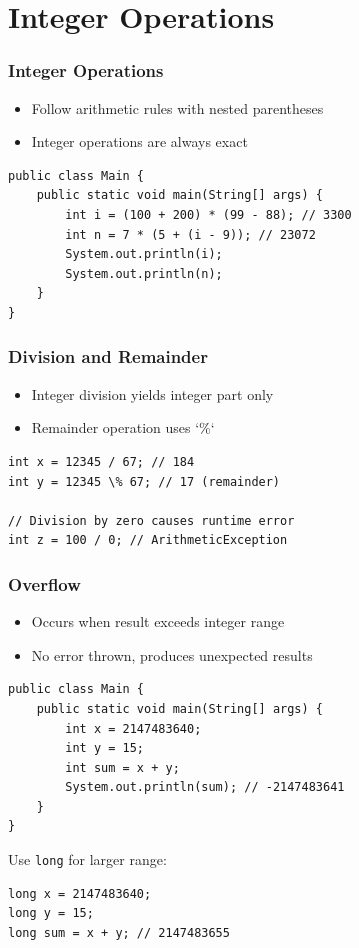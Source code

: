 \documentclass[serif, aspectratio=169]{beamer}
\begin{document}
\section{Integer Operations}
\begin{frame}[fragile]
\frametitle{Integer Operations}
\begin{itemize}
    \item Follow arithmetic rules with nested parentheses
    \item Integer operations are always exact
\end{itemize}
\begin{lstlisting}
public class Main {
    public static void main(String[] args) {
        int i = (100 + 200) * (99 - 88); // 3300
        int n = 7 * (5 + (i - 9)); // 23072
        System.out.println(i);
        System.out.println(n);
    }
}
\end{lstlisting}
\end{frame}

\begin{frame}[fragile]
\frametitle{Division and Remainder}
\begin{itemize}
    \item Integer division yields integer part only
    \item Remainder operation uses `\%`
\end{itemize}
\begin{lstlisting}
int x = 12345 / 67; // 184
int y = 12345 \% 67; // 17 (remainder)

// Division by zero causes runtime error
int z = 100 / 0; // ArithmeticException
\end{lstlisting}
\end{frame}

\begin{frame}[fragile]
\frametitle{Overflow}
\begin{itemize}
    \item Occurs when result exceeds integer range
    \item No error thrown, produces unexpected results
\end{itemize}
\begin{lstlisting}
public class Main {
    public static void main(String[] args) {
        int x = 2147483640;
        int y = 15;
        int sum = x + y;
        System.out.println(sum); // -2147483641
    }
}
\end{lstlisting}
Use \texttt{long} for larger range:
\begin{lstlisting}
long x = 2147483640;
long y = 15;
long sum = x + y; // 2147483655
\end{lstlisting}
\end{frame}
\end{document}
